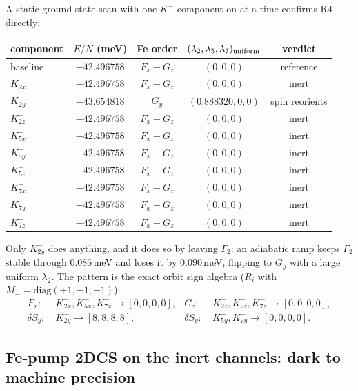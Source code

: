 \documentclass[11pt,a4paper]{article}
\newcommand{\diag}{\mathrm{diag}}
\begin{document}
A static ground-state scan with one $K^-$ component on at a time confirms R4
directly:
\begin{center}
\renewcommand{\arraystretch}{1.15}
\begin{tabular}{lcccc}
\toprule
component & $E/N$ (meV) & Fe order & $(\lambda_2,\lambda_5,\lambda_7)_{\rm uniform}$ & verdict \\
\midrule
baseline & $-42.496758$ & $F_x+G_z$ & $(0,0,0)$ & reference \\
$K^-_{2x}$ & $-42.496758$ & $F_x+G_z$ & $(0,0,0)$ & inert \\
$K^-_{2y}$ & $-43.654818$ & $G_y$ & $(0.888320,0,0)$ & spin reorients \\
$K^-_{2z}$ & $-42.496758$ & $F_x+G_z$ & $(0,0,0)$ & inert \\
$K^-_{5x}$ & $-42.496758$ & $F_x+G_z$ & $(0,0,0)$ & inert \\
$K^-_{5y}$ & $-42.496758$ & $F_x+G_z$ & $(0,0,0)$ & inert \\
$K^-_{5z}$ & $-42.496758$ & $F_x+G_z$ & $(0,0,0)$ & inert \\
$K^-_{7x}$ & $-42.496758$ & $F_x+G_z$ & $(0,0,0)$ & inert \\
$K^-_{7y}$ & $-42.496758$ & $F_x+G_z$ & $(0,0,0)$ & inert \\
$K^-_{7z}$ & $-42.496758$ & $F_x+G_z$ & $(0,0,0)$ & inert \\
\bottomrule
\end{tabular}
\end{center}
Only $K^-_{2y}$ does anything, and it does so by leaving $\Gamma_2$: an adiabatic
ramp keeps $\Gamma_2$ stable through $0.085\,$meV and loses it by $0.090\,$meV,
flipping to $G_y$ with a large uniform $\lambda_2$.  The pattern is the exact
orbit sign algebra ($R_i$ with $M_-=\diag(+1,-1,-1)$):
\begin{align}
  F_x:&\ K^-_{2x},K^-_{5x},K^-_{7x}\to[0,0,0,0], &
  G_z:&\ K^-_{2z},K^-_{5z},K^-_{7z}\to[0,0,0,0], \\
  \delta S_y:&\ K^-_{2y}\to[8,8,8,8], &
  \delta S_y:&\ K^-_{5y},K^-_{7y}\to[0,0,0,0].
\end{align}

\subsection{Fe-pump 2DCS on the inert channels: dark to machine precision}
\end{document}
